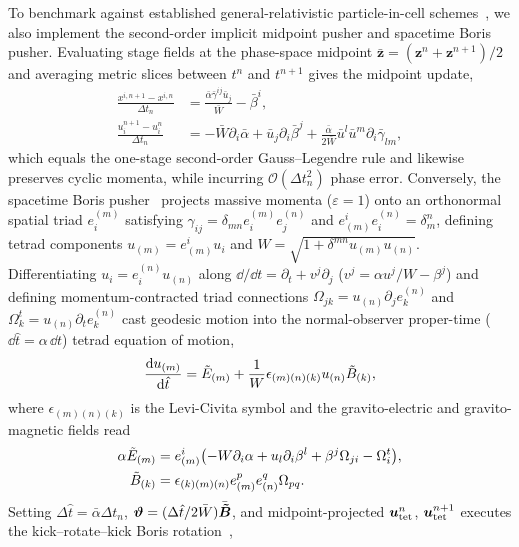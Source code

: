 To benchmark against established general-relativistic particle-in-cell schemes~\cite{Bacchini:2020cze,Olivares:2021cfa,Boyeneni:2025tsx,Wu:2026nrpic}, we also implement the second-order implicit midpoint pusher and spacetime Boris pusher. Evaluating stage fields at the phase-space midpoint $\bar{\bm{z}} = (\bm{z}^n + \bm{z}^{n+1})/2$ and averaging metric slices between $t^n$ and $t^{n+1}$ gives the midpoint update,
\begin{align}\label{eq:midpoint_update}
\frac{x^{i,n+1} - x^{i,n}}{\Delta t_n} &= \frac{\bar{\alpha}\bar{\gamma}^{ij}\bar{u}_j}{\bar{W}} - \bar{\beta}^i, \nonumber\\
\frac{u_i^{n+1} - u_i^n}{\Delta t_n} &= -\bar{W}\partial_i\bar{\alpha} + \bar{u}_j\partial_i\bar{\beta}^j + \frac{\bar{\alpha}}{2\bar{W}}\bar{u}^l\bar{u}^m\partial_i\bar{\gamma}_{lm},
\end{align}
which equals the one-stage second-order Gauss--Legendre rule and likewise preserves cyclic momenta, while incurring $\mathcal{O}(\Delta t_n^2)$ phase error. Conversely, the spacetime Boris pusher~\cite{Olivares:2021cfa,Boyeneni:2025tsx,Wu:2026nrpic} projects massive momenta ($\varepsilon = 1$) onto an orthonormal spatial triad $e^{(m)}_i$ satisfying $\gamma_{ij} = \delta_{mn} e^{(m)}_i e^{(n)}_j$ and $e^i_{(m)} e^{(n)}_i = \delta^n_m$, defining tetrad components $u_{(m)} = e^i_{(m)} u_i$ and $W = \sqrt{1 + \delta^{mn}u_{(m)}u_{(n)}}$. Differentiating $u_i = e^{(n)}_i u_{(n)}$ along $\dd/\dd t = \partial_t + v^j\partial_j$ ($v^j = \alpha u^j/W - \beta^j$) and defining momentum-contracted triad connections $\Omega_{jk} = u_{(n)}\partial_j e^{(n)}_k$ and $\Omega^t_k = u_{(n)}\partial_t e^{(n)}_k$ cast geodesic motion into the normal-observer proper-time ($\dd\hat{t} = \alpha\,\dd t$) tetrad equation of motion,
\begin{equation}\label{eq:tetrad_eom}
\frac{\mathrm{d} u_{(m)}}{\mathrm{d}\hat{t}} = \tilde{E}_{(m)} + \frac{1}{W}\epsilon_{(m)(n)(k)} u_{(n)} \tilde{B}_{(k)},
\end{equation}
where $\epsilon_{(m)(n)(k)}$ is the Levi-Civita symbol and the gravito-electric and gravito-magnetic fields read
\begin{align}\label{eq:gravito_em}
\alpha\tilde{E}_{(m)} &= e^i_{(m)}\bigl(-W\partial_i\alpha + u_l\partial_i\beta^l + \beta^j\Omega_{ji} - \Omega^t_i\bigr), \nonumber\\
\tilde{B}_{(k)} &= \epsilon_{(k)(m)(n)} e^p_{(m)} e^q_{(n)} \Omega_{pq}.
\end{align}
Setting $\Delta\hat{t} = \bar{\alpha}\Delta t_n$, $\bm{\vartheta} = (\Delta\hat{t}/2\bar{W})\bar{\bm{\tilde{B}}}$, and midpoint-projected $\bm{u}_{\rm tet}^n$, $\bm{u}_{\rm tet}^{n+1}$ executes the kick--rotate--kick Boris rotation~\cite{boris1970relativistic},
